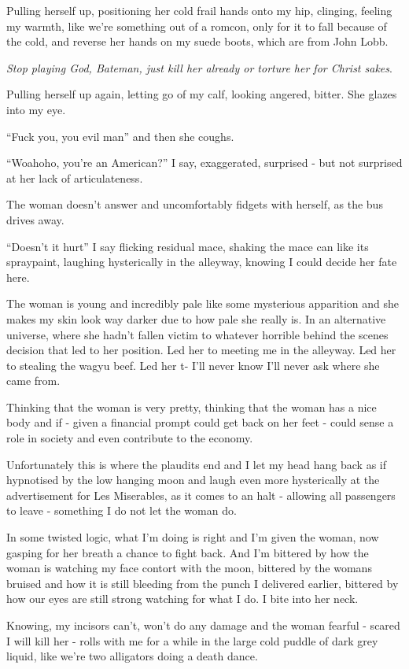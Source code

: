 \documentclass[19pt,openany]{book}
\begin{document}
Pulling herself up,
positioning her cold frail
hands onto my hip,
clinging,
feeling my warmth,
like we're something
out of a romcon, only
for it to fall because
of the cold, and reverse her
hands on my suede boots,
which are from John Lobb.

\textit{Stop playing God, Bateman,
just kill her already or torture
her for Christ sakes}.

Pulling herself up
again, letting
go of my calf, looking angered,
bitter. She glazes into my eye.

``Fuck you, you evil man'' and
then she coughs.

``Woahoho, you're an American?'' I
say, exaggerated, surprised - but
not surprised at her
lack of articulateness.

The woman doesn't answer and
uncomfortably fidgets with
herself, as the bus drives
away.

``Doesn't it hurt'' I say
flicking residual mace,
shaking the mace
can like its spraypaint,
laughing hysterically in the alleyway,
knowing I could decide
her fate here.

The woman is young and
incredibly pale like some mysterious
apparition and she makes my skin
look way darker due to how pale she really
is. In an alternative universe,
where she hadn't fallen
victim to whatever horrible
behind the scenes decision
that led to her position.
Led her to meeting me in the
alleyway. Led her to stealing
the wagyu beef. Led her t-
I'll never know I'll never
ask where she came from.

Thinking that the woman
is very pretty, thinking
that the woman has a nice
body and if - given a financial
prompt could get back
on her feet - could sense
a role in society and even
contribute to the economy.

Unfortunately this is where
the plaudits end and I let
my head hang back as if
hypnotised by the low hanging
moon and laugh even
more hysterically at the
advertisement for Les
Miserables, as it comes
to an halt - allowing all
passengers to leave -
something I do not let the woman
do.

In some twisted logic,
what I'm doing is right
and I'm given the woman,
now gasping for her breath
a chance to fight back.
And I'm
bittered by how the woman
is watching my face contort
with the moon, bittered
by the womans
bruised and how it
is still bleeding
from the punch I delivered
earlier, bittered
by how our eyes
are still strong
watching for what
I do. I bite into her
neck.

Knowing, my incisors
can't, won't do any damage
and the woman fearful - scared
I will kill her - rolls with me
for a while in the large
cold puddle of dark grey
liquid, like we're two alligators
doing a death dance.
\end{document}
